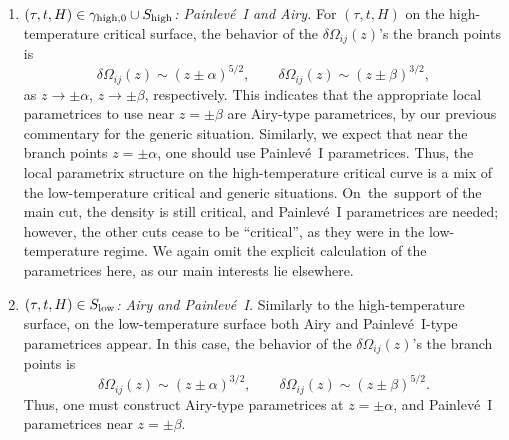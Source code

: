 \documentclass[10pt,a4paper]{amsart}
\numberwithin{equation}{section}
\begin{document}
\begin{Remark}
\begin{enumerate}
 \item[$(3)$] \textit{$(\tau,t,H)\in \gamma_{{\rm high},0} \cup S_{{\rm high}}$: Painlev\'{e}~I and Airy.}
 For $(\tau,t,H)$ on the high-temperature critical surface, the behavior of the $\delta \Omega_{ij}(z)$'s the branch points is
 \begin{equation*}
 \delta \Omega_{ij}(z) \sim (z\pm \alpha)^{5/2}, \qquad \delta \Omega_{ij}(z) \sim (z\pm \beta)^{3/2},
 \end{equation*}
 as $z\to \pm \alpha$, $z\to \pm \beta$, respectively. This indicates that the appropriate local
 parametrices to use near $z=\pm \beta$ are Airy-type parametrices, by our previous commentary for the generic situation. Similarly, we expect that near
 the branch points $z=\pm \alpha$, one should use Painlev\'{e}~I parametrices. Thus, the local parametrix structure on the high-temperature critical curve
 is a mix of the low-temperature critical and generic situations. On~the~support of the main cut, the density is still critical, and Painlev\'{e}~I
 parametrices are needed; however, the other cuts cease to be ``critical'', as they were in the low-temperature regime.
 We again omit the explicit calculation of the parametrices here, as our main interests lie elsewhere.

 \item[$(4)$] \textit{$(\tau,t,H)\in S_{{\rm low}}$: Airy and Painlev\'{e}~I.}
 Similarly to the high-temperature surface, on the low-temperature surface both Airy and Painlev\'{e}~I-type parametrices appear. In this case, the behavior of the $\delta \Omega_{ij}(z)$'s the branch points is
 \begin{equation*}
 \delta \Omega_{ij}(z) \sim (z\pm \alpha)^{3/2}, \qquad \delta \Omega_{ij}(z) \sim (z\pm \beta)^{5/2}.
 \end{equation*}
 Thus, one must construct Airy-type parametrices at $z=\pm \alpha$, and Painlev\'{e}~I parametrices near
 $z=\pm\beta$.


\end{enumerate}
\end{Remark}
\end{document}
